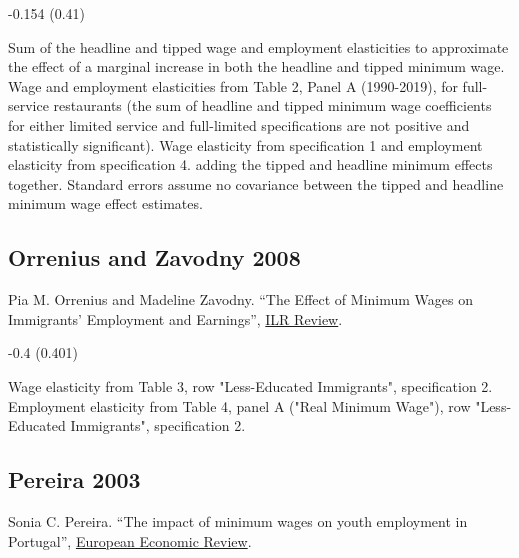  -0.154 (0.41)

\vspace{0.7em}

 Sum of the headline and tipped wage and employment elasticities to approximate the effect of a marginal increase in both the headline and tipped minimum wage. Wage and employment elasticities from Table 2, Panel A (1990-2019), for full-service restaurants (the sum of headline and tipped minimum wage coefficients for either limited service and full-limited specifications are not positive and statistically significant). Wage elasticity from specification 1 and employment elasticity from specification 4. adding the tipped and headline minimum effects together. Standard errors assume no covariance between the tipped and headline minimum wage effect estimates.

\subsection*{Orrenius and Zavodny 2008}
\vspace{-0.7em}

\noindent Pia M. Orrenius and Madeline Zavodny. ``The Effect of Minimum Wages on Immigrants' Employment and Earnings'', \href{https://doi.org/10.1177/001979390806100406}{ILR Review}.

\vspace{0.7em}

 -0.4 (0.401)

\vspace{0.7em}

 Wage elasticity from Table 3, row "Less-Educated Immigrants", specification 2. Employment elasticity from Table 4, panel A ("Real Minimum Wage"), row "Less-Educated Immigrants", specification 2.

\subsection*{Pereira 2003}
\vspace{-0.7em}

\noindent Sonia C. Pereira. ``The impact of minimum wages on youth employment in Portugal'', \href{https://doi.org/10.1016/S0014-2921(02)00209-X}{European Economic Review}.

\vspace{0.7em}

